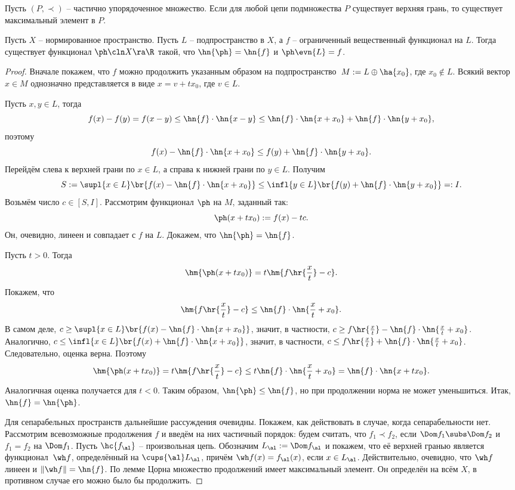 \documentclass[a4paper]{article}
\begin{document}
\begin{stm}
Пусть $(P, \prec)$ -- частично упорядоченное множество. Если для любой цепи
подмножества $P$ существует верхняя грань, то существует максимальный элемент в $P$.
\end{stm}

\begin{theorem}
Пусть $X$ -- нормированное пространство. Пусть $L$ -- подпространство в $X$, а $f$ -- ограниченный
вещественный функционал на $L$. Тогда существует функционал $\ph\cln X \ra \R$ такой, что
$\hn{\ph} = \hn{f}$ и $\ph\evn{L} = f$.
\end{theorem}
\begin{proof}
Вначале покажем, что $f$ можно продолжить указанным образом на подпространство~${M := L \oplus \ha{x_0}}$,
где $x_0 \notin L$. Всякий вектор $x \in M$ однозначно представляется в виде $x = v + t x_0$, где $v \in L$.

Пусть $x,y\in L$, тогда
$$f(x) - f(y) = f(x-y) \le \hn{f}\cdot\hn{x-y} \le \hn{f}\cdot\hn{x+x_0} + \hn{f}\cdot\hn{y+x_0},$$
поэтому
$$f(x) - \hn{f}\cdot\hn{x+x_0} \le f(y)+\hn{f}\cdot\hn{y+x_0}.$$
Перейдём слева к верхней грани по $x \in L$, а справа к нижней грани по $y \in L$. Получим
$$S := \supl{x\in L}\br{f(x) - \hn{f}\cdot\hn{x+x_0}} \le \infl{y\in L}\br{f(y)+\hn{f}\cdot\hn{y+x_0}} =: I.$$
Возьмём число $c \in [S, I]$. Рассмотрим функционал $\ph$ на $M$, заданный так:
$$\ph(x + t x_0) := f(x) - t c.$$
Он, очевидно, линеен и совпадает с $f$ на $L$. Докажем, что $\hn{\ph} = \hn{f}$.

Пусть $t > 0$. Тогда
$$\hm{\ph(x+t x_0)} = t\hm{f\hr{\frac xt} - c}.$$
Покажем, что $$\hm{f\hr{\frac xt} - c} \le \hn{f}\cdot\hn{\frac xt + x_0}.$$
В самом деле, $c \ge \supl{x\in L}\br{f(x) - \hn{f}\cdot\hn{x+x_0}}$, значит,
в частности, $c \ge f\hr{\frac xt} - \hn{f}\cdot\hn{\frac xt+x_0}$. Аналогично,
$c \le \infl{x\in L}\br{f(x) + \hn{f}\cdot\hn{x+x_0}}$, значит,
в частности, $c \le f\hr{\frac xt} + \hn{f}\cdot\hn{\frac xt+x_0}$. Следовательно,
оценка верна. Поэтому
$$\hm{\ph(x+t x_0)} = t\hm{f\hr{\frac xt} - c} \le t \hn{f} \cdot\hn{\frac xt + x_0} = \hn{f}\cdot\hn{x + t x_0}.$$
Аналогичная оценка получается для $t < 0$. Таким образом, $\hn{\ph} \le \hn{f}$, но при продолжении
норма не может уменьшиться. Итак, $\hn{f} = \hn{\ph}$.

Для сепарабельных пространств дальнейшие рассуждения очевидны. Покажем, как действовать в случае,
когда сепарабельности нет. Рассмотрим всевозможные продолжения $f$ и введём на них частичный порядок:
будем считать, что $f_1 \prec f_2$, если $\Dom  f_1 \subs \Dom f_2$ и $f_1 = f_2$ на $\Dom f_1$.
Пусть $\hc{f_\al}$ -- произвольная цепь. Обозначим $L_\al := \Dom f_\al$ и покажем, что её
верхней гранью является функционал~$\wh f$, определённый на $\cups{\al} L_\al$, причём $\wh f(x) = f_\al(x)$,
если $x \in L_\al$. Действительно, очевидно, что $\wh f$ линеен и $\|\wh f\| = \hn{f}$. По лемме Цорна
множество продолжений имеет максимальный элемент. Он определён на всём $X$, в противном случае его
можно было бы продолжить.
\end{proof}
\end{document}
